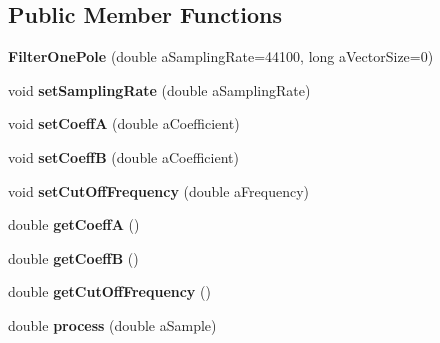 \subsection*{Public Member Functions}
\begin{DoxyCompactItemize}
\item 
\hypertarget{class_filter_one_pole_aa420e43a875791fa5332aaa3d5654f5a}{{\bfseries Filter\-One\-Pole} (double a\-Sampling\-Rate=44100, long a\-Vector\-Size=0)}\label{class_filter_one_pole_aa420e43a875791fa5332aaa3d5654f5a}

\item 
\hypertarget{class_filter_one_pole_a118ec1e24997eb8603f34f30f8fd06a5}{void {\bfseries set\-Sampling\-Rate} (double a\-Sampling\-Rate)}\label{class_filter_one_pole_a118ec1e24997eb8603f34f30f8fd06a5}

\item 
\hypertarget{class_filter_one_pole_ab44016c3073687e627d9196c07ddb494}{void {\bfseries set\-Coeff\-A} (double a\-Coefficient)}\label{class_filter_one_pole_ab44016c3073687e627d9196c07ddb494}

\item 
\hypertarget{class_filter_one_pole_a0ae3f86d4d9d2ce37fa020e6f15942f6}{void {\bfseries set\-Coeff\-B} (double a\-Coefficient)}\label{class_filter_one_pole_a0ae3f86d4d9d2ce37fa020e6f15942f6}

\item 
\hypertarget{class_filter_one_pole_a322259144e6df23695578991234a4561}{void {\bfseries set\-Cut\-Off\-Frequency} (double a\-Frequency)}\label{class_filter_one_pole_a322259144e6df23695578991234a4561}

\item 
\hypertarget{class_filter_one_pole_a5edb88ff5424eb6cadf16be1316770b1}{double {\bfseries get\-Coeff\-A} ()}\label{class_filter_one_pole_a5edb88ff5424eb6cadf16be1316770b1}

\item 
\hypertarget{class_filter_one_pole_ab746acf7c5a865d3145856aa0edb8ff1}{double {\bfseries get\-Coeff\-B} ()}\label{class_filter_one_pole_ab746acf7c5a865d3145856aa0edb8ff1}

\item 
\hypertarget{class_filter_one_pole_a8e3e803096cb900f7f822f9b8359b447}{double {\bfseries get\-Cut\-Off\-Frequency} ()}\label{class_filter_one_pole_a8e3e803096cb900f7f822f9b8359b447}

\item 
\hypertarget{class_filter_one_pole_a1f137013e13ccb09916c1a300af8c043}{double {\bfseries process} (double a\-Sample)}\label{class_filter_one_pole_a1f137013e13ccb09916c1a300af8c043}


\end{DoxyCompactItemize}
